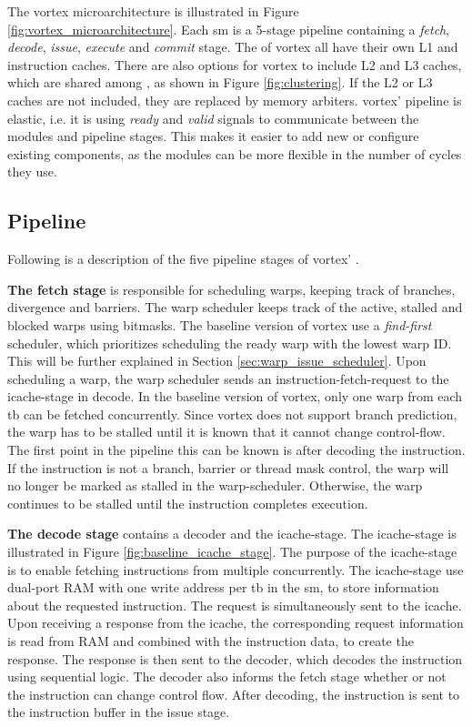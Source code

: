 The \Gls{vortex} microarchitecture is illustrated in Figure \ref{fig:vortex_microarchitecture}. Each \acrshort{sm} is a 5-stage pipeline containing a \textit{fetch}, \textit{decode}, \textit{issue}, \textit{execute} and \textit{commit} stage. The  of \Gls{vortex} all have their own L1 and instruction caches. There are also options for \Gls{vortex} to include L2 and L3 caches, which are shared among , as shown in Figure \ref{fig:clustering}. If the L2 or L3 caches are not included, they are replaced by memory arbiters. \Gls{vortex}' pipeline is elastic\cite{elastic_pipeline}, i.e. it is using \textit{ready} and \textit{valid} signals to communicate between the modules and pipeline stages. This makes it easier to add new or configure existing components, as the modules can be more flexible in the number of cycles they use.

\subsection{Pipeline} \label{sec:vortex_pipeline}
Following is a description of the five pipeline stages of \Gls{vortex}' .

\vspace{1mm}\noindent
\textbf{The fetch stage} is responsible for scheduling warps, keeping track of branches, divergence and barriers. The warp scheduler keeps track of the active, stalled and blocked warps using bitmasks. The baseline version of \Gls{vortex} use a \textit{find-first} scheduler, which prioritizes scheduling the ready warp with the lowest warp ID. This will be further explained in Section \ref{sec:warp_issue_scheduler}. Upon scheduling a warp, the warp scheduler sends an instruction-fetch-request to the icache-stage in decode. In the baseline version of \Gls{vortex}, only one warp from each \acrshort{tb} can be fetched concurrently. Since vortex does not support branch prediction, the warp has to be stalled until it is known that it cannot change control-flow. The first point in the pipeline this can be known is after decoding the instruction. If the instruction is not a branch, barrier or thread mask control, the warp will no longer be marked as stalled in the warp-scheduler. Otherwise, the warp continues to be stalled until the instruction completes execution.

\noindent
\textbf{The decode stage} contains a decoder and the icache-stage. The icache-stage is illustrated in Figure \ref{fig:baseline_icache_stage}. The purpose of the icache-stage is to enable fetching instructions from multiple  concurrently. The icache-stage use dual-port RAM with one write address per \acrshort{tb} in the \acrshort{sm}, to store information about the requested instruction. The request is simultaneously sent to the icache. Upon receiving a response from the icache, the corresponding request information is read from RAM and combined with the instruction data, to create the response. The response is then sent to the decoder, which decodes the instruction using sequential logic. The decoder also informs the fetch stage whether or not the instruction can change control flow. After decoding, the instruction is sent to the instruction buffer in the issue stage.


